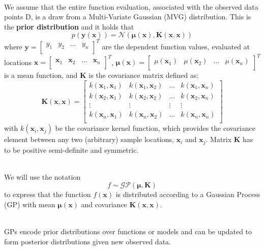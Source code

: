 \documentclass[12pt,a4paper]{article}
\begin{document}
\noindent
\\We assume that the entire function evaluation, associated with the observed data points D, is a draw from a Multi-Variate Gaussian (MVG) distribution. This is the \textbf{prior distribution} and it holds that
$$
p(\mathbf{y}(\mathbf{x}))=\mathcal{N}(\boldsymbol{\mu}(\mathbf{x}),\mathbf{K}(\mathbf{x},\mathbf{x}))
$$
where $\mathbf{y} = \begin{bmatrix} y_1 & y_2 & \dots & y_n\\ \end{bmatrix}^{T}$ are the dependent function values, evaluated at locations $\mathbf{x} = \begin{bmatrix} \mathbf{x}_1 & \mathbf{x}_2 & \dots & \mathbf{x}_n\\ \end{bmatrix}^{T}$, $\boldsymbol\mu(\mathbf{x}) = \begin{bmatrix} \mu(\mathbf{x}_1) & \mu(\mathbf{x}_2) & \dots & \mu(\mathbf{x}_n)\\ \end{bmatrix}^{T}$ is a mean function, and $\mathbf{K}$ is the covariance matrix defined as:
$$
\mathbf{K}(\mathbf{x},\mathbf{x}) =
\begin{bmatrix}
k(\mathbf{x}_1,\mathbf{x}_1) & k(\mathbf{x}_1,\mathbf{x}_2) & \ldots & k(\mathbf{x}_1,\mathbf{x}_n)\\
k(\mathbf{x}_2,\mathbf{x}_1) & k(\mathbf{x}_2,\mathbf{x}_2) & \ldots & k(\mathbf{x}_2,\mathbf{x}_n)\\
\vdots & \vdots & \vdots & \vdots\\
k(\mathbf{x}_n,\mathbf{x}_1) & k(\mathbf{x}_n,\mathbf{x}_2) & \ldots & k(\mathbf{x}_n,\mathbf{x}_n)\\
\end{bmatrix}
$$
with $k(\mathbf{x}_i,\mathbf{x}_j)$ be the covariance kernel function, which provides the covariance element between any two (arbitrary) sample locations, $\mathbf{x}_i$ and $\mathbf{x}_j$. Matrix $\mathbf{K}$ has to be positive semi-definite and symmetric. 

\noindent
\\We will use the notation
$$
f \sim \mathcal{GP}(\boldsymbol\mu,\mathbf{K})
$$
to express that the function $f(\mathbf{x})$ is distributed according to a Gaussian Process (GP) with mean $\boldsymbol\mu(\mathbf{x})$ and covariance $\mathbf{K}(\mathbf{x},\mathbf{x})$.

\noindent
\\GPs encode prior distributions over functions or models and can be updated to form posterior distributions given new observed data.
\end{document}
